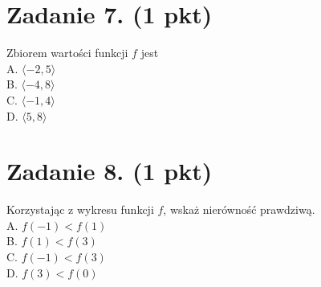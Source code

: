 \documentclass[10pt]{article}
\begin{document}
\section*{Zadanie 7. (1 pkt)}
Zbiorem wartości funkcji \(f\) jest\\
A. \(\langle-2,5\rangle\)\\
B. \(\langle-4,8\rangle\)\\
C. \(\langle-1,4\rangle\)\\
D. \(\langle 5,8\rangle\)

\section*{Zadanie 8. (1 pkt)}
Korzystając z wykresu funkcji \(f\), wskaż nierówność prawdziwą.\\
A. \(f(-1)<f(1)\)\\
B. \(f(1)<f(3)\)\\
C. \(f(-1)<f(3)\)\\
D. \(f(3)<f(0)\)
\end{document}
